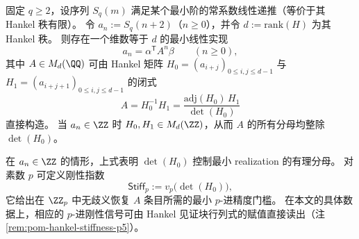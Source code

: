 \begin{proposition}\label{prop:pom-hankel-realization-protocol}
固定 \(q\ge 2\)，设序列 \(S_q(m)\) 满足某个最小阶的常系数线性递推（等价于其 Hankel 秩有限）。
令 \(a_n:=S_q(n+2)\)（\(n\ge 0\)），并令 \(d:=\mathrm{rank}(H)\) 为其 Hankel 秩。
则存在一个维数等于 \(d\) 的最小线性实现
\[
a_n=\alpha^{\mathsf T}A^n\beta\qquad(n\ge 0),
\]
其中 \(A\in M_d(\QQ)\) 可由 Hankel 矩阵 \(H_0=(a_{i+j})_{0\le i,j\le d-1}\) 与 \(H_1=(a_{i+j+1})_{0\le i,j\le d-1}\) 的闭式
\[
A=H_0^{-1}H_1=\frac{\mathrm{adj}(H_0)\,H_1}{\det(H_0)}
\]
直接构造。
当 \(a_n\in\ZZ\) 时 \(H_0,H_1\in M_d(\ZZ)\)，从而 \(A\) 的所有分母均整除 \(\det(H_0)\)。
\end{proposition}

\begin{remark}\label{rem:pom-hankel-denominator-stiffness}
在 \(a_n\in\ZZ\) 的情形，上式表明 \(\det(H_0)\) 控制最小 realization 的有理分母。
对素数 \(p\) 可定义刚性指数
\[
\mathsf{Stiff}_p:=v_p\!\bigl(\det(H_0)\bigr),
\]
它给出在 \(\ZZ_p\) 中无歧义恢复 \(A\) 条目所需的最小 \(p\)-进精度门槛。
在本文的具体数据上，相应的 \(p\)-进刚性信号可由 Hankel 见证块行列式的赋值直接读出（注 \ref{rem:pom-hankel-stiffness-p5}）。
\end{remark}

